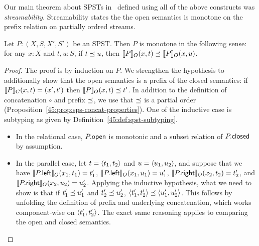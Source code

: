 Our main theorem about SPSTs in~
defined using all of the above constructs was \emph{streamability}.
Streamability states the the open semantics is monotone on the prefix
relation on partially ordred streams.

\begin{theorem}
\label{45:thm:spst-monotonicity}
Let $P: (X, S, X', S')$ be an SPST.
Then $P$ is monotone in the following sense:
for any $x: X$ and $t, u: S$,
if $t\prefix u$,
then $\spstsemO{x}{t}{P} \prefix \spstsemO{x}{u}{P}$.
\end{theorem}
\begin{proof}
  The proof is by induction on $P$.
  We strengthen the hypothesis to additionally show that
  the open semantics is a prefix of the closed semantics:
  if $\spstsemC{x}{t}{P} = (x', t')$ then $\spstsemO{x}{t}{P} \prefix t'$.
  In addition to the definition of concatenation $\circ$
  and prefix $\prefix$,
  we use that $\prefix$ is a partial order
  (Proposition~\ref{45:prop:sps-concat-properties}).
  One of the inductive case is subtyping
  as given by Definition~\ref{45:def:spst-subtyping}.
  \begin{itemize}
  \item In the relational case,
  $\spstfield{P}{open}$ is monotonic and a subset relation
  of $\spstfield{P}{closed}$ by assumption.
  \item In the parallel case,
  let $t = \spspar{t_1}{t_2}$ and $u = \spspar{u_1}{u_2}$,
  and suppose that we have
  $\spstsemO{x_1}{t_1}{\spstfield{P}{left}} = t_1'$,
  $\spstsemO{x_1}{u_1}{\spstfield{P}{left}} = u_1'$,
  $\spstsemO{x_2}{t_2}{\spstfield{P}{right}} = t_2'$, and
  $\spstsemO{x_2}{u_2}{\spstfield{P}{right}} = u_2'$.
  Applying the inductive hypothesis, what we need to
  show is that if $t_1' \prefix u_1'$ and $t_2' \prefix u_2'$,
  $\spspar{t_1'}{t_2'} \prefix \spspar{u_1'}{u_2'}$.
  This follows by unfolding the definition of prefix and underlying concatenation,
  which works component-wise on $\spspar{t_1'}{t_2'}$.
  The exact same reasoning applies to
  comparing the open and closed semantics.


\end{itemize}
\end{proof}
